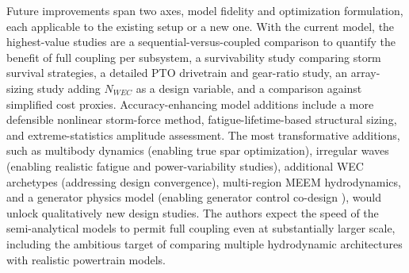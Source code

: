 \else
    Future improvements span two axes, model fidelity and optimization formulation, each applicable to the existing setup or a new one.
    With the current model, the highest-value studies are a sequential-versus-coupled comparison to quantify the benefit of full coupling per subsystem, a survivability study comparing storm survival strategies, a detailed PTO drivetrain and gear-ratio study, an array-sizing study adding $N_{WEC}$ as a design variable, and a comparison against simplified cost proxies.
    Accuracy-enhancing model additions include a more defensible nonlinear storm-force method, fatigue-lifetime-based structural sizing, and extreme-statistics amplitude assessment.
    The most transformative additions, such as multibody dynamics (enabling true spar optimization), irregular waves (enabling realistic fatigue and power-variability studies), additional WEC archetypes (addressing design convergence), multi-region MEEM hydrodynamics, and a generator physics model (enabling generator control co-design \cite{anderson_re-imagining_2024,barter_beyond_2023}), would unlock qualitatively new design studies.
    The authors expect the speed of the semi-analytical models to permit full coupling even at substantially larger scale, including the ambitious target of comparing multiple hydrodynamic architectures with realistic powertrain models.
\fi
